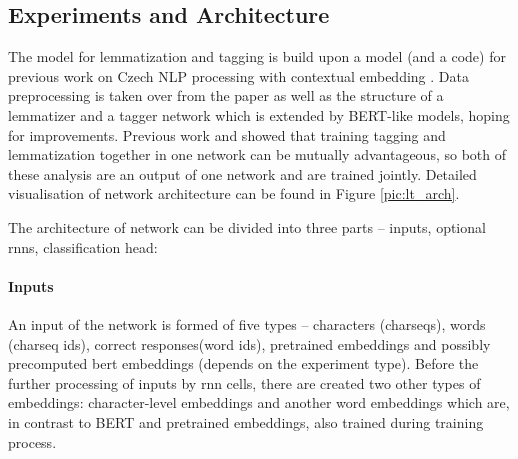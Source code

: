 \subsection{Experiments and Architecture}






The model for lemmatization and tagging is build upon a model (and a code) for previous work on Czech NLP processing with contextual embedding \citep{straka2019czech}. 
Data preprocessing is taken over from the paper as well as the structure of a lemmatizer and a tagger network which is extended by BERT-like models, hoping for improvements. Previous work \citep{Straka2019} and \citep{Straka2018} showed that training tagging and lemmatization together in one network can be mutually advantageous, so both of these analysis are an output of one network and are trained jointly. Detailed visualisation of network architecture can be found in Figure \ref{pic:lt_arch}. \par The architecture of network can be divided into three parts -- inputs, optional \acrshort{rnn}s, classification head:
\paragraph{Inputs}
An input of the network is formed of five types -- characters (charseqs), words (charseq ids), correct responses(word ids), pretrained embeddings and possibly precomputed bert embeddings (depends on the experiment type). Before the further processing of inputs by \acrshort{rnn} cells, there are created two other types of embeddings: character-level embeddings and another word embeddings which are, in contrast to BERT and pretrained embeddings, also trained during training process.

